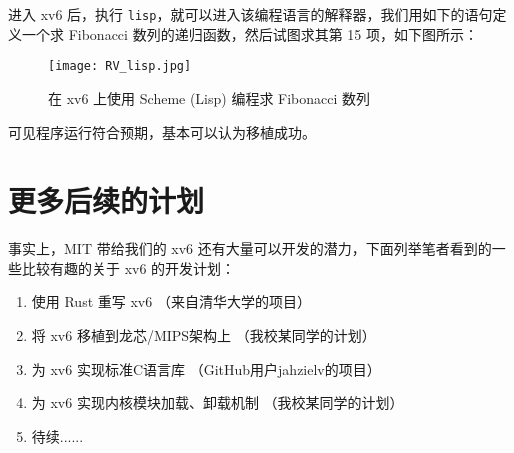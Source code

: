 进入 xv6 后，执行 \lstinline{lisp}，就可以进入该编程语言的解释器，我们用如下的语句定义一个求 Fibonacci 数列的递归函数，然后试图求其第 15 项，如下图所示：

\begin{figure}[H]
    \centering
    \texttt{[image: RV\_lisp.jpg]}
    \caption{ 在 xv6 上使用 Scheme (Lisp) 编程求 Fibonacci 数列}
\end{figure}

可见程序运行符合预期，基本可以认为移植成功。

\section{更多后续的计划}

事实上，MIT 带给我们的 xv6 还有大量可以开发的潜力，下面列举笔者看到的一些比较有趣的关于 xv6 的开发计划：
\begin{enumerate}
    \item 使用 Rust 重写 xv6 （来自清华大学的项目）
    \item 将 xv6 移植到龙芯/MIPS架构上 （我校某同学的计划）
    \item 为 xv6 实现标准C语言库 （GitHub用户jahzielv的项目）
    \item 为 xv6 实现内核模块加载、卸载机制 （我校某同学的计划）
    \item 待续......
\end{enumerate}